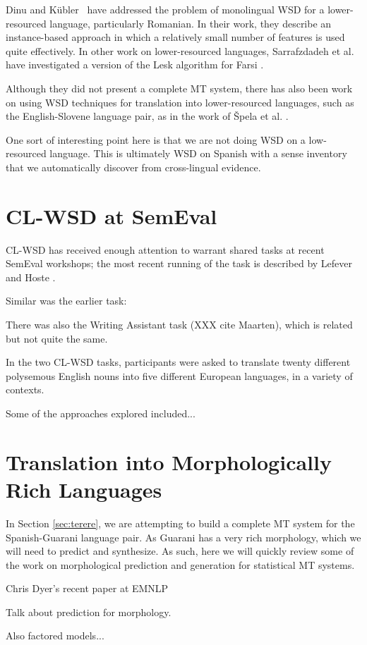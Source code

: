Dinu and Kübler~\cite{Dinu07} have addressed the problem of monolingual WSD for
a lower-resourced language, particularly Romanian. In their work, they describe
an instance-based approach in which a relatively small number of features is
used quite effectively. In other work on lower-resourced languages,
Sarrafzdadeh et al. have investigated a version of the Lesk algorithm
for Farsi \cite{sarrafzdadeh}.

Although they did not present a complete MT system, there has also been work
on using WSD techniques for translation into lower-resourced languages, such as
the English-Slovene language pair, as in
the work of \v{S}pela et al.
\cite{vintar-fivser-vrvsvcaj:2012:ESIRMT-HyTra2012}. 

One sort of interesting point here is that we are not doing WSD on a
low-resourced language. This is ultimately WSD on Spanish with a sense
inventory that we automatically discover from cross-lingual evidence.


\section{CL-WSD at SemEval}
CL-WSD has received enough attention to warrant shared tasks at recent SemEval
workshops; the most recent running of the task is described by Lefever and
Hoste \cite{task10}.

Similar was the earlier task: \cite{lefever-hoste:2009:SEW}

There was also the Writing Assistant task (XXX cite Maarten), which is related
but not quite the same.

In the two CL-WSD tasks, participants were asked to translate twenty different
polysemous English nouns into five different European languages, in a variety
of contexts.

Some of the approaches explored included...


\section{Translation into Morphologically Rich Languages}
In Section \ref{sec:terere}, we are attempting to build a complete MT system
for the Spanish-Guarani language pair. As Guarani has a very rich morphology,
which we will need to predict and synthesize. As such, here we will quickly
review some of the work on morphological prediction and generation for
statistical MT systems.

Chris Dyer's recent paper at EMNLP
\cite{chahuneau:2013:emnlp}

Talk about prediction for morphology.
\cite{toutanova-suzuki-ruopp:2008:ACLMain}

Also factored models...
\cite{yeniterzi-oflazer:2010:ACL}
